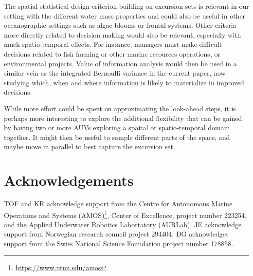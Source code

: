 \documentclass[aoas]{imsart}
\begin{document}
The spatial statistical design criterion building on excursion sets is relevant in our setting with the different water mass properties and could also be useful in other oceanographic settings such as algae-blooms or frontal systems. Other criteria more directly related to decision making would also be relevant, especially with much spatio-temporal effects. For instance, managers must make difficult decisions related to fish farming or other marine resources operations, or environmental projects. Value of information analysis \citep{Eidsvik:15} would then be used in a similar vein as the integrated Bernoulli variance in the current paper, now studying which, when and where information is likely to materialize in improved decisions. 

While more effort could be spent on approximating the look-ahead steps, it is perhaps more interesting to explore the additional flexibility that can be gained by having two or more AUVs \citep{ferreira2019advancing} exploring a spatial or spatio-temporal domain together. It might then be useful to sample different parts of the space, and maybe move in parallel to best capture the excursion set.

\section*{Acknowledgements}
TOF and KR acknowledge support from the Centre for Autonomous Marine Operations and Systems (AMOS)\footnote{\url{https://www.ntnu.edu/amos}}, Center of Excellence, project number 223254, and the Applied Underwater Robotics Labortatory (AURLab). JE acknowledge support from Norwegian research council project 294404. DG acknowledges support from the Swiss National Science Foundation project number 178858.


\footnotesize



\end{document}
